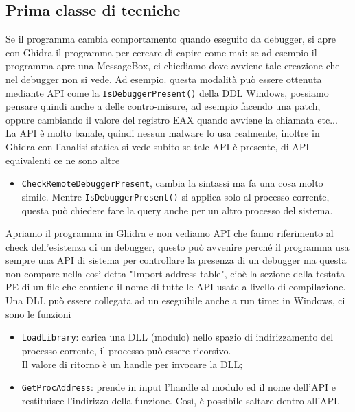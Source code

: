 \documentclass[12pt, oneside]{extbook}
\begin{document}
\subsection{Prima classe di tecniche}
Se il programma cambia comportamento quando eseguito da debugger, si apre con Ghidra il programma per cercare di capire come mai: se ad esempio il programma apre una MessageBox, ci chiediamo dove avviene tale creazione che nel debugger non si vede. Ad esempio. questa modalità può essere ottenuta mediante API come la \texttt{IsDebuggerPresent()} della DDL Windows, possiamo pensare quindi anche a delle contro-misure, ad esempio facendo una patch, oppure cambiando il valore del registro EAX quando avviene la chiamata etc...\\La API è molto banale, quindi nessun malware lo usa realmente, inoltre in Ghidra con l'analisi statica si vede subito se tale API è presente, di API equivalenti ce ne sono altre
\begin{itemize}
\item \texttt{CheckRemoteDebuggerPresent}, cambia la sintassi ma fa una cosa molto simile. Mentre \texttt{IsDebuggerPresent()} si applica solo al processo corrente, questa può chiedere fare la query anche per un altro processo del sistema.
\end{itemize}
Apriamo il programma in Ghidra e non vediamo API che fanno riferimento al check dell'esistenza di un debugger, questo può avvenire perché il programma usa sempre una API di sistema per controllare la presenza di un debugger ma questa non compare nella così detta "Import address table", cioè la sezione della testata PE di un file che contiene il nome di tutte le API usate a livello di compilazione. Una DLL può essere collegata ad un eseguibile anche a run time: in Windows, ci sono le funzioni
\begin{itemize}
\item \texttt{LoadLibrary}: carica una DLL (modulo) nello spazio di indirizzamento del processo corrente, il processo può essere ricorsivo.\\Il valore di ritorno è un handle per invocare la DLL;
\item \texttt{GetProcAddress}: prende in input l'handle al modulo ed il nome dell'API e restituisce l'indirizzo della funzione. Così, è possibile saltare dentro all'API.
\end{itemize}
\end{document}

